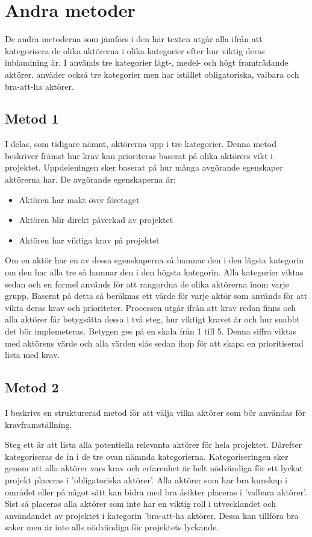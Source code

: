 \section{Andra metoder}
De andra metoderna som jämförs i den här texten utgår alla ifrån att kategorisera de olika aktörerna i olika kategorier efter hur viktig deras inblandning är. I \cite{cs_novel} används tre kategorier lågt-, medel- och högt framträdande aktörer. \cite{cs_sturctured} anväder också tre kategorier men har istället obligatoriska, valbara och bra-att-ha aktörer.

\subsection{Metod 1}
I \cite{cs_novel} delas, som tidigare nämnt, aktörerna upp i tre kategorier. Denna metod beskriver främst hur krav kan prioriteras baserat på olika aktörers vikt i projektet.
Uppdeleningen sker baserat på hur många avgörande egenskaper aktörerna har. De avgörande egenskaperna är:
\begin{itemize}
	\item Aktören har makt över företaget
	\item Aktören blir direkt påverkad av projektet
	\item Aktören har viktiga krav på projektet
\end{itemize}

Om en aktör har en av dessa egenskaperna så hamnar den i den lägsta kategorin om den har alla tre så hamnar den i den högsta kategorin. Alla kategorier viktas sedan och en formel används för att rangordna de olika aktörerna inom varje grupp. Baserat på detta så beräknas ett värde för varje aktör som används för att vikta deras krav och prioriteter. Processen utgår ifrån att krav redan finns och alla aktörer får betygsätta dessa i två steg, hur viktigt kravet är och hur snabbt det bör implemeteras. Betygen ges på en skala från 1 till 5. Denna siffra viktas med aktörens värde och alla värden slås sedan ihop för att skapa en prioritiserad lista med krav.

\subsection{Metod 2}
I \cite{cs_structured} beskrivs en strukturerad metod för att välja vilka aktörer som bör användas för kravframställning. 

Steg ett är att lista alla potentiella relevanta aktörer för hela projektet.
Därefter kategoriseras de in i de tre ovan nämnda kategorierna. Kategoriseringen sker genom att alla aktörer vars krav och erfarenhet är helt nödvändiga för ett lyckat projekt placeras i 'obligatoriska aktörer'. Alla aktörer som har bra kunskap i området eller på något sätt kan bidra med bra åsikter placeras i 'valbara aktörer'. Sist så placeras alla aktörer som inte har en viktig roll i utvecklandet och användandet av projektet i kategorin 'bra-att-ha aktörer. Dessa kan tillföra bra saker men är inte alls nödvändiga för projektets lyckande. 

